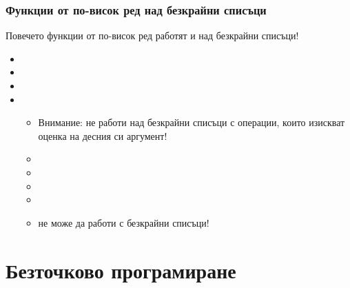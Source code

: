 \documentclass[alsotrans,beameroptions={aspectratio=169}]{beamerswitch}
\begin{document}
\begin{frame}
  \frametitle{Функции от по-висок ред над безкрайни списъци}

  Повечето функции от по-висок ред работят и над безкрайни списъци!
  \begin{itemize}[<+->]
  \item {}
  \item {}
  \item {}
  \item {}
    \begin{itemize}
    \item \alert{Внимание:}  не работи над безкрайни списъци с операции, които изискват оценка на десния си аргумент!
    \item {}
    \item {}
    \item {}
    \item {}
    \item \alert{ не може да работи с безкрайни списъци!}
    \end{itemize}
  \end{itemize}
\end{frame}

\section{Безточково програмиране}
\end{document}
